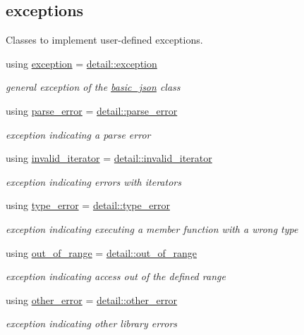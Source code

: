 \subsection*{exceptions}
\label{_amgrp19ad27801b95bd1f2c6c2bf83dbb7515}%
Classes to implement user-\/defined exceptions. \begin{DoxyCompactItemize}
\item 
using \hyperlink{classnlohmann_1_1basic__json_a14824c27188d2fee4861806cd5f23d22}{exception} = \hyperlink{classnlohmann_1_1detail_1_1exception}{detail\+::exception}
\begin{DoxyCompactList}\small\item\em general exception of the \hyperlink{classnlohmann_1_1basic__json}{basic\+\_\+json} class \end{DoxyCompactList}\item 
using \hyperlink{classnlohmann_1_1basic__json_a555b05e9da63d486126759922685a37a}{parse\+\_\+error} = \hyperlink{classnlohmann_1_1detail_1_1parse__error}{detail\+::parse\+\_\+error}
\begin{DoxyCompactList}\small\item\em exception indicating a parse error \end{DoxyCompactList}\item 
using \hyperlink{classnlohmann_1_1basic__json_a6ccc9788413fd58de998fe92743cb4aa}{invalid\+\_\+iterator} = \hyperlink{classnlohmann_1_1detail_1_1invalid__iterator}{detail\+::invalid\+\_\+iterator}
\begin{DoxyCompactList}\small\item\em exception indicating errors with iterators \end{DoxyCompactList}\item 
using \hyperlink{classnlohmann_1_1basic__json_ace5bf851eafe85bd6332f978991bc11c}{type\+\_\+error} = \hyperlink{classnlohmann_1_1detail_1_1type__error}{detail\+::type\+\_\+error}
\begin{DoxyCompactList}\small\item\em exception indicating executing a member function with a wrong type \end{DoxyCompactList}\item 
using \hyperlink{classnlohmann_1_1basic__json_a2251d8523fa6d16c0fba6388ffa2ef8c}{out\+\_\+of\+\_\+range} = \hyperlink{classnlohmann_1_1detail_1_1out__of__range}{detail\+::out\+\_\+of\+\_\+range}
\begin{DoxyCompactList}\small\item\em exception indicating access out of the defined range \end{DoxyCompactList}\item 
using \hyperlink{classnlohmann_1_1basic__json_a6fc373c99facc37aadbc5651b3d6631d}{other\+\_\+error} = \hyperlink{classnlohmann_1_1detail_1_1other__error}{detail\+::other\+\_\+error}
\begin{DoxyCompactList}\small\item\em exception indicating other library errors \end{DoxyCompactList}\end{DoxyCompactItemize}
